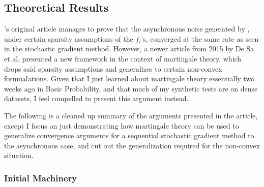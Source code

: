 \subsection{Theoretical Results}

\hogwild's original article \cite{2011NRRW} manages to prove that the
asynchronous noise generated by \hogwild, under certain sparsity assumptions of
the $f_i$'s, converged at the same rate as seen in the stochastic gradient
method. However, a newer article from 2015 by De Sa et al. \cite{2015SZOR}
presented a new framework in the context of martingale theory, which drops said
sparsity assumptions and generalizes to certain non-convex formualations. Given
that I just learned about martingale theory essentially two weeks ago in Basic
Probability, and that much of my synthetic tests are on dense datasets, I feel
compelled to present this argument instead. 

The following is a cleaned up summary of the arguments presented in the article,
except I focus on just demonstrating how martingale theory can be used to
generalize convergence arguments for a sequential stochastic gradient method to
the asynchronous case, and cut out the generalization required for the
non-convex situation.

\subsubsection{Initial Machinery}


